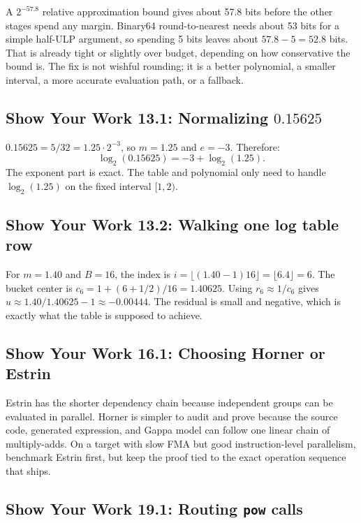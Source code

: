 \documentclass[manuscript, nonacm]{acmart}
\begin{document}
    A $2^{-57.8}$ relative approximation bound gives about 57.8 bits before the
    other stages spend any margin. Binary64 round-to-nearest needs about 53 bits
    for a simple half-ULP argument, so spending 5 bits leaves about $57.8 - 5 =
    52.8$ bits. That is already tight or slightly over budget, depending on how
    conservative the bound is. The fix is not wishful rounding; it is a better
    polynomial, a smaller interval, a more accurate evaluation path, or a fallback.

    \subsection*{Show Your Work 13.1: Normalizing $0.15625$}

    $0.15625 = 5/32 = 1.25 \cdot 2^{-3}$, so $m = 1.25$ and $e = -3$.
    Therefore:
    \[
        \log_2(0.15625) = -3 + \log_2(1.25).
    \]
    The exponent part is exact. The table and polynomial only need to handle
    $\log_2(1.25)$ on the fixed interval $[1,2)$.

    \subsection*{Show Your Work 13.2: Walking one log table row}

    For $m = 1.40$ and $B = 16$, the index is
    $i = \lfloor (1.40 - 1)16 \rfloor = \lfloor 6.4 \rfloor = 6$. The bucket
    center is $c_6 = 1 + (6 + 1/2)/16 = 1.40625$. Using $r_6 \approx 1/c_6$ gives
    $u \approx 1.40/1.40625 - 1 \approx -0.00444$. The residual is small and
    negative, which is exactly what the table is supposed to achieve.

    \subsection*{Show Your Work 16.1: Choosing Horner or Estrin}

    Estrin has the shorter dependency chain because independent groups can be
    evaluated in parallel. Horner is simpler to audit and prove because the source
    code, generated expression, and Gappa model can follow one linear chain of
    multiply-adds. On a target with slow FMA but good instruction-level
    parallelism, benchmark Estrin first, but keep the proof tied to the exact
    operation sequence that ships.

    \subsection*{Show Your Work 19.1: Routing \texttt{pow} calls}
\end{document}
